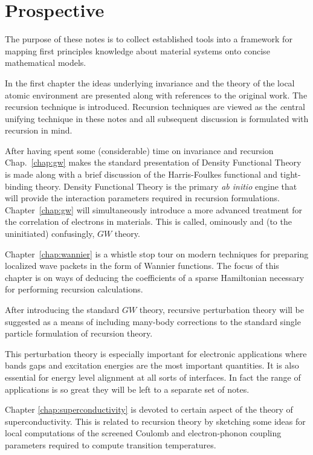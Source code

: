 \section{Prospective}
The purpose of these notes is to collect established tools into 
a framework for mapping first principles knowledge about material systems 
onto concise mathematical models. 

In the first chapter the ideas underlying invariance and the 
theory of the local atomic environment are presented along with references
to the original work. The recursion technique is introduced. 
Recursion techniques are viewed as the {\emph central unifying technique} in these
notes and all subsequent discussion is formulated with recursion in mind.

After having spent some (considerable) time on invariance and recursion
Chap.~\ref{chap:gw} makes the standard presentation of Density Functional Theory is made along 
with a brief discussion of the Harris-Foulkes functional and tight-binding theory. 
Density Functional Theory is the primary {\it ab initio} engine that will 
provide the interaction parameters required in recursion formulations.
Chapter~\ref{chap:gw} will simultaneously introduce a more advanced 
treatment for the correlation of electrons in materials.
This is called, ominously and (to the uninitiated) confusingly, $GW$ theory.

Chapter~\ref{chap:wannier} is a whistle stop tour 
on modern techniques for preparing localized wave packets in the 
form of Wannier functions. The focus of this chapter is on 
ways of deducing the coefficients of a sparse Hamiltonian
necessary for performing recursion calculations.

After introducing the standard $GW$ theory, recursive perturbation theory
will be suggested as a means of including many-body corrections 
to the standard single particle formulation of recursion theory. 

This perturbation theory is especially important for electronic 
applications where bands gaps and excitation energies 
are the most important quantities. It is also essential for
energy level alignment at all sorts of interfaces. In fact the range
of applications is so great they will be left to a separate set of notes.

Chapter \ref{chap:superconductivity} is devoted to
certain aspect of the theory of superconductivity. 
This is related to recursion theory by sketching some ideas for 
local computations of the screened Coulomb and electron-phonon
coupling parameters required to compute transition temperatures.

